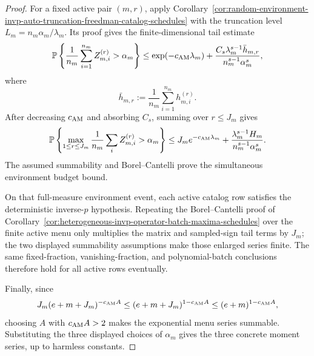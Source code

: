 \documentclass[11pt]{amsart}
\numberwithin{equation}{section}
\theoremstyle{definition}
\theoremstyle{remark}
\newcommand{\Prob}{\mathbb P}
\begin{document}
\begin{proof}
For a fixed active pair \((m,r)\), apply
Corollary~\ref{cor:random-environment-invp-auto-truncation-freedman-catalog-schedules}
with the truncation level \(L_m=n_m\alpha_m/\lambda_m\).  Its proof gives the
finite-dimensional tail estimate
\[
  \Prob\left\{
    \frac1{n_m}\sum_{i=1}^{n_m}Z_{m,i}^{(r)}>\alpha_m
  \right\}
  \le
  \exp(-c_{\rm AM}\lambda_m)
  +
  \frac{C_s\lambda_m^{s-1}\bar h_{m,r}}
       {n_m^{s-1}\alpha_m^s},
\]
where
\[
  \bar h_{m,r}:=\frac1{n_m}\sum_{i=1}^{n_m}h_{m,i}^{(r)}.
\]
After decreasing \(c_{\rm AM}\) and absorbing \(C_s\), summing over
\(r\le J_m\) gives
\[
  \Prob\left\{
    \max_{1\le r\le J_m}
    \frac1{n_m}\sum_i Z_{m,i}^{(r)}>\alpha_m
  \right\}
  \le
  J_m e^{-c_{\rm AM}\lambda_m}
  +
  \frac{\lambda_m^{s-1}H_m}{n_m^{s-1}\alpha_m^s}.
\]
The assumed summability and Borel--Cantelli prove the simultaneous environment
budget bound.

On that full-measure environment event, each active catalog row satisfies the
deterministic inverse-\(p\) hypothesis.  Repeating the Borel--Cantelli proof of
Corollary~\ref{cor:heterogeneous-invp-operator-batch-maxima-schedules} over the
finite active menu only multiplies the matrix and sampled-sign tail terms by
\(J_m\); the two displayed summability assumptions make those enlarged series
finite.  The same fixed-fraction, vanishing-fraction, and polynomial-batch
conclusions therefore hold for all active rows eventually.

Finally, since
\[
  J_m(e+m+J_m)^{-c_{\rm AM}A}
  \le (e+m+J_m)^{1-c_{\rm AM}A}
  \le (e+m)^{1-c_{\rm AM}A},
\]
choosing \(A\) with \(c_{\rm AM}A>2\) makes the exponential menu series
summable.  Substituting the three displayed choices of \(\alpha_m\) gives the
three concrete moment series, up to harmless constants.
\end{proof}
\end{document}
